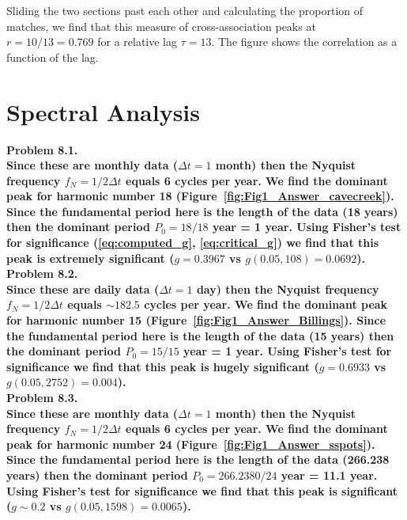 Sliding the two sections past each other and calculating the proportion of matches, we find that
this measure of cross-association peaks at $r = 10/13 = 0.769$ for a relative lag $\tau = 13$.
The figure shows the correlation as a function of the lag.

\section{Spectral Analysis}

\noindent
\bf{Problem 8.1.} \\

Since these are monthly data ($\Delta t = 1$ month) then the Nyquist frequency $f_N = 1/2\Delta t$ equals
6 cycles per year.  We find the dominant peak for harmonic number 18 (Figure~\ref{fig:Fig1_Answer_cavecreek}).
Since the fundamental period here
is the length of the data (18 years) then the dominant period $P_0 = 18/18$ year = 1 year. Using Fisher's
test for significance (\ref{eq:computed_g}, \ref{eq:critical_g}) we find that this peak
is extremely significant ($g = 0.3967$ vs $g(0.05,108) = 0.0692$). \\


\noindent
\bf{Problem 8.2.} \\

Since these are daily data ($\Delta t = 1$ day) then the Nyquist frequency $f_N = 1/2\Delta t$ equals
$\sim 182.5$ cycles per year.  We find the dominant peak for harmonic number 15 (Figure~\ref{fig:Fig1_Answer_Billings}).
Since the fundamental period here
is the length of the data (15 years) then the dominant period $P_0 = 15/15$ year = 1 year. Using Fisher's
test for significance we find that this peak is hugely significant ($g = 0.6933$ vs $g(0.05,2752) = 0.004$). \\


\noindent
\bf{Problem 8.3.} \\

Since these are monthly data ($\Delta t = 1$ month) then the Nyquist frequency $f_N = 1/2\Delta t$ equals
6 cycles per year.  We find the dominant peak for harmonic number 24 (Figure~\ref{fig:Fig1_Answer_sspots}).  Since the fundamental period here
is the length of the data (266.238 years) then the dominant period $P_0 = 266.2380/24$ year = 11.1 year. Using Fisher's
test for significance we find that this peak is significant ($g \sim 0.2$ vs $g(0.05,1598) = 0.0065$). \\


